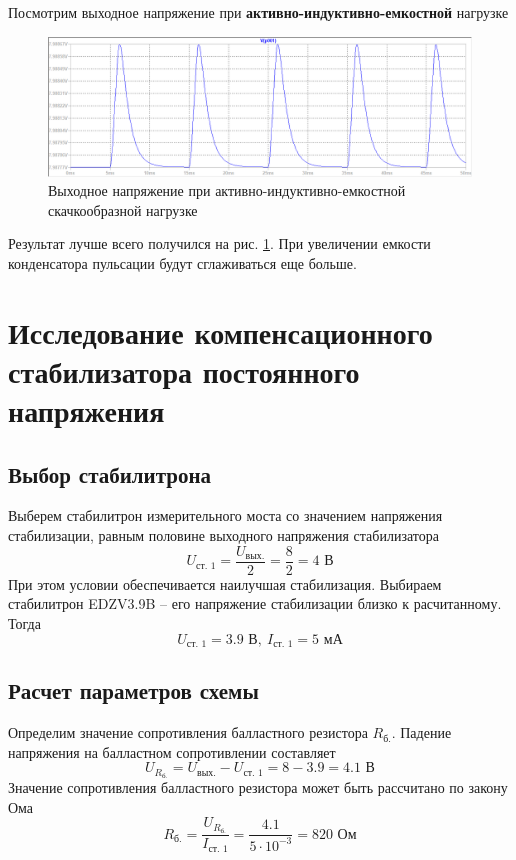 \documentclass[a4paper, 12pt]{article}
\begin{document}
    \noindent Посмотрим выходное напряжение при \textbf{активно-индуктивно-емкостной} нагрузке
    \begin{figure}[H]
        \centering
        \includegraphics[scale=0.46]{2task_rect_ALC.png}
        \captionsetup{skip=0pt}
        \caption{Выходное напряжение при активно-индуктивно-емкостной скачкообразной нагрузке}
        \label{fig:2task_rect_ALC}
    \end{figure}
    \noindent Результат лучше всего получился на рис. \ref{fig:2task_rect_ALC}.
    При увеличении емкости конденсатора пульсации будут сглаживаться еще больше.


    \section{Исследование компенсационного стабилизатора постоянного напряжения}
    \subsection{Выбор стабилитрона}
    Выберем стабилитрон измерительного моста со значением напряжения
    стабилизации, равным половине выходного напряжения стабилизатора
    $$
    U_{\text{ст. 1}}=\dfrac{U_{\text{вых.}}}{2}=\dfrac{8}{2}=4\text{ В}
    $$
    При этом условии обеспечивается наилучшая стабилизация.
    Выбираем стабилитрон EDZV3.9B -- его напряжение стабилизации
    близко к расчитанному. Тогда
    $$
    U_{\text{ст. 1}}=3.9\text{ В},\ I_{\text{ст. 1}}=5\text{ мА}
    $$


    \subsection{Расчет параметров схемы}
    Определим значение сопротивления балластного резистора
    $R_{\text{б.}}$. Падение напряжения на балластном сопротивлении
    составляет
    $$
    U_{R_\text{б.}}=U_{\text{вых.}}-U_{\text{ст. 1}}=8-3.9=4.1\text{ В}
    $$
    Значение сопротивления балластного резистора может быть рассчитано по закону Ома
    $$
    R_{\text{б.}}=\dfrac{U_{R_\text{б.}}}{I_{\text{ст. 1}}}=\dfrac{4.1}{5\cdot10^{-3}}=820\text{ Ом}
    $$
\end{document}
